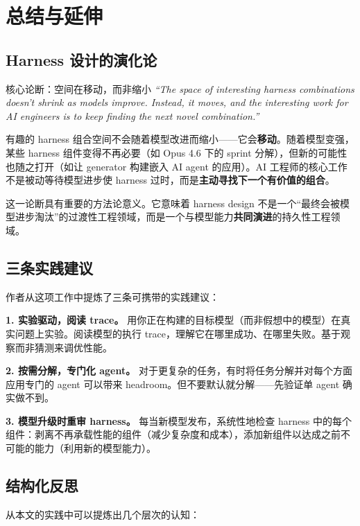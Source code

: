 \section{总结与延伸}

\subsection{Harness 设计的演化论}

\begin{importantbox}{核心论断：空间在移动，而非缩小}
\textit{``The space of interesting harness combinations doesn't shrink as models improve. Instead, it moves, and the interesting work for AI engineers is to keep finding the next novel combination.''}

有趣的 harness 组合空间不会随着模型改进而缩小——它会\textbf{移动}。随着模型变强，某些 harness 组件变得不再必要（如 Opus 4.6 下的 sprint 分解），但新的可能性也随之打开（如让 generator 构建嵌入 AI agent 的应用）。AI 工程师的核心工作不是被动等待模型进步使 harness 过时，而是\textbf{主动寻找下一个有价值的组合}。
\end{importantbox}

这一论断具有重要的方法论意义。它意味着 harness design 不是一个``最终会被模型进步淘汰''的过渡性工程领域，而是一个与模型能力\textbf{共同演进}的持久性工程领域。

\subsection{三条实践建议}

作者从这项工作中提炼了三条可携带的实践建议：

\textbf{1. 实验驱动，阅读 trace。} 用你正在构建的目标模型（而非假想中的模型）在真实问题上实验。阅读模型的执行 trace，理解它在哪里成功、在哪里失败。基于观察而非猜测来调优性能。

\textbf{2. 按需分解，专门化 agent。} 对于更复杂的任务，有时将任务分解并对每个方面应用专门的 agent 可以带来 headroom。但不要默认就分解——先验证单 agent 确实做不到。

\textbf{3. 模型升级时重审 harness。} 每当新模型发布，系统性地检查 harness 中的每个组件：剥离不再承载性能的组件（减少复杂度和成本），添加新组件以达成之前不可能的能力（利用新的模型能力）。

\subsection{结构化反思}

从本文的实践中可以提炼出几个层次的认知：

